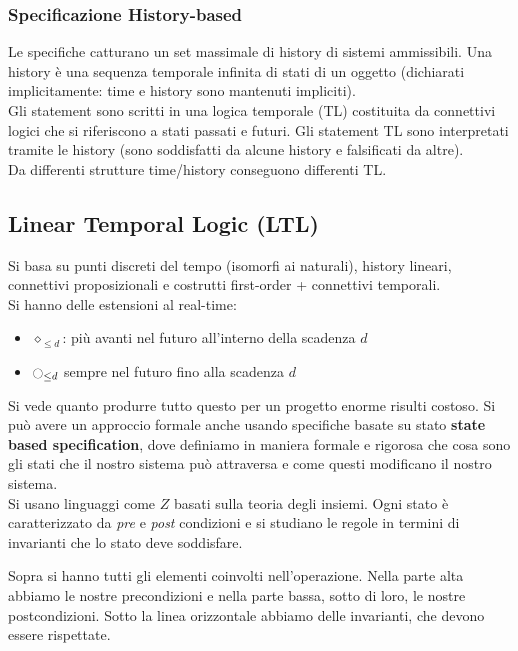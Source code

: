 \subsubsection{Specificazione History-based}
Le specifiche catturano un set massimale di history di sistemi ammissibili. Una history è una sequenza temporale infinita di stati di un oggetto (dichiarati implicitamente: time e history sono mantenuti impliciti).\\
Gli statement sono scritti in una logica temporale (TL) costituita da connettivi logici che si riferiscono a stati passati e futuri. Gli statement TL sono interpretati tramite le history (sono soddisfatti da alcune history e falsificati da altre).\\
Da differenti strutture time/history conseguono differenti TL.
\subsection{Linear Temporal Logic (LTL)}
Si basa su punti discreti del tempo (isomorfi ai naturali), history lineari, connettivi proposizionali e costrutti first-order + connettivi temporali.\\
Si hanno delle estensioni al real-time:
\begin{itemize}
    \item $\diamond_{\leq d}$: più avanti nel futuro all’interno della scadenza $d$
    \item $\ocircle_{\leq d}$ sempre nel futuro fino alla scadenza $d$
\end{itemize}
Si vede quanto produrre tutto questo per un progetto enorme risulti costoso. Si può avere un approccio formale anche usando specifiche basate su stato \textbf{state based specification}, dove definiamo in maniera formale e rigorosa che cosa sono gli stati che il nostro sistema può attraversa e come questi modificano il nostro sistema. \\ Si usano linguaggi come $Z$ basati sulla teoria degli insiemi. Ogni stato è caratterizzato da \textit{pre} e \textit{post} condizioni e si studiano le regole in termini di invarianti che lo stato deve soddisfare.

Sopra si hanno tutti gli elementi coinvolti nell'operazione. Nella parte alta abbiamo le nostre precondizioni e nella parte bassa, sotto di loro, le nostre postcondizioni. Sotto la linea orizzontale abbiamo delle invarianti, che devono essere rispettate.\\

